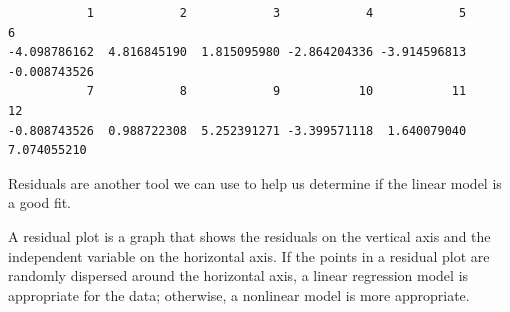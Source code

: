 \documentclass[
  letterpaper,
  DIV=11,
  numbers=noendperiod]{scrreprt}
\begin{document}
\begin{verbatim}
           1            2            3            4            5            6 
-4.098786162  4.816845190  1.815095980 -2.864204336 -3.914596813 -0.008743526 
           7            8            9           10           11           12 
-0.808743526  0.988722308  5.252391271 -3.399571118  1.640079040  7.074055210 
\end{verbatim}

Residuals are another tool we can use to help us determine if the linear
model is a good fit.

A residual plot is a graph that shows the residuals on the vertical axis
and the independent variable on the horizontal axis. If the points in a
residual plot are randomly dispersed around the horizontal axis, a
linear regression model is appropriate for the data; otherwise, a
nonlinear model is more appropriate.
\end{document}
